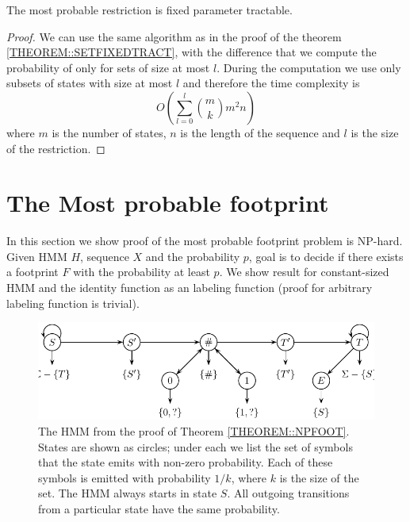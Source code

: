 \begin{theorem}
The most probable restriction is fixed parameter tractable.
\end{theorem}
\begin{proof}
We can use the same algorithm as in the proof of the theorem
\ref{THEOREM::SETFIXEDTRACT}, with the difference that we compute the
probability of only for sets of size at most $l$. During the computation we use
only subsets of states with size at most $l$ and therefore the time complexity
is 
\begin{equation}
O\left(\sum_{l=0}^l{m\choose k}m^2n\right)
\end{equation}
where $m$ is the number of states, $n$ is the length of the sequence and $l$ is
the size of the restriction.
\end{proof}

\section{The Most probable footprint}
\label{sec:footprint}

In this section we show proof of the most probable footprint problem is
NP-hard.  Given HMM $H$, sequence $X$ and the probability $p$, goal is to
decide if there exists a footprint $F$ with the probability at least $p$. We
show result for constant-sized HMM and the identity function as an labeling
function (proof for arbitrary labeling function is trivial).
\begin{figure}
\centerline{\includegraphics[scale=0.68]{../figures/jcss/cliquehmm.pdf}}
\caption[HMM for which footprint is NP-hard to optimize]{\label{fig:footprint_hmm} The HMM from the proof of Theorem
  \ref{THEOREM::NPFOOT}. States are shown as circles; under each we
  list the set of symbols that the state emits with non-zero
  probability. Each of these symbols is emitted with probability
  $1/k$, where $k$ is the size of the set. The HMM always starts in
  state $S$. All outgoing transitions from a particular state have
  the same probability.}
\end{figure}

